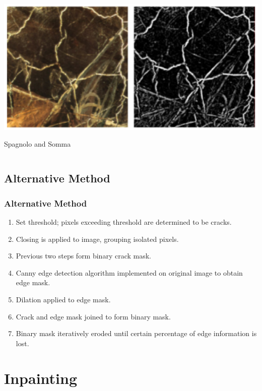 \documentclass{beamer}
\begin{document}
\begin{frame}
\begin{columns}
\begin{column}{0.5\textwidth}
\includegraphics[width=1\textwidth]{white_top_hat}
\begin{center}
\tiny Spagnolo and Somma
\end{center}
\end{column}
\end{columns}
\end{frame}

\subsection[Alternative Method]{Alternative Method}

\begin{frame}
\frametitle{Alternative Method}
\begin{enumerate}
\item Set threshold; pixels exceeding threshold are determined to be cracks.
\item Closing is applied to image, grouping isolated pixels.
\item Previous two steps form binary crack mask.
\item Canny edge detection algorithm implemented on original image to obtain edge mask.
\item Dilation applied to edge mask.
\item Crack and edge mask joined to form binary mask.
\item Binary mask iteratively eroded until certain percentage of edge information is lost.
\end{enumerate}
\end{frame}

\section[Inpainting]{Inpainting}
\end{document}
